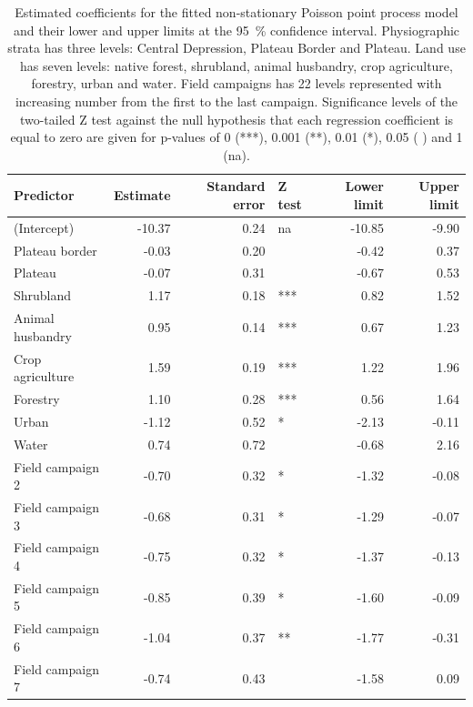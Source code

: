 \begin{table}[!ht]
 \caption[Estimated coefficients for the fitted non-stationary Poisson point process model.]{Estimated 
coefficients for the fitted non-stationary Poisson point process model and their lower and upper limits at the 
\SI{95}{\percent} confidence interval. Physiographic strata has three levels: Central Depression, Plateau 
Border and Plateau. Land use has seven levels: native forest, shrubland, animal husbandry, crop agriculture, 
forestry, urban and water. Field campaigns has \num{22} levels represented with 
 increasing number from the first to the last campaign. Significance levels of the two-tailed Z test against 
the null 
 hypothesis that each regression coefficient is equal to zero are given for p-values of \num{0} (***), 
 \num{0.001} (**), \num{0.01} (*), \num{0.05} ( ) and \num{1} (na).}
 \label{tab:chap07-coef}
 \centering\footnotesize
 \begin{tabular}{lrrlrr}
  \hline
  Predictor		& Estimate 	& Standard error	& Z test & Lower limit 	& Upper limit	\\ 
  \hline
  (Intercept)		& -10.37 	& 0.24 			& na 	& -10.85	& -9.90         \\ 
  Plateau border	& -0.03 	& 0.20 			&    	& -0.42 	& 0.37	\\ 
  Plateau		& -0.07 	& 0.31 			&    	& -0.67 	& 0.53 	\\ 
  Shrubland		& 1.17 		& 0.18 			& *** 	& 0.82 	        & 1.52 	\\ 
  Animal husbandry	& 0.95 		& 0.14 			& *** 	& 0.67 		& 1.23 	\\ 
  Crop agriculture	& 1.59 		& 0.19 			& *** 	& 1.22 		& 1.96 	\\ 
  Forestry		& 1.10 		& 0.28 			& *** 	& 0.56 		& 1.64 	\\ 
  Urban			& -1.12 	& 0.52 			& * 	& -2.13 	& -0.11 \\ 
  Water			& 0.74 		& 0.72 			&    	& -0.68 	& 2.16 	\\ 
  Field campaign 2	& -0.70 	& 0.32 			& * 	& -1.32 	& -0.08\\ 
  Field campaign 3	& -0.68 	& 0.31 			& * 	& -1.29 	& -0.07\\ 
  Field campaign 4	& -0.75 	& 0.32 			& * 	& -1.37 	& -0.13\\ 
  Field campaign 5	& -0.85 	& 0.39 			& * 	& -1.60 	& -0.09 \\ 
  Field campaign 6	& -1.04 	& 0.37 			& **	& -1.77 	& -0.31 \\ 
  Field campaign 7	& -0.74 	& 0.43 			&    	& -1.58 	& 0.09 	\\ 

\end{tabular}
\end{table}
